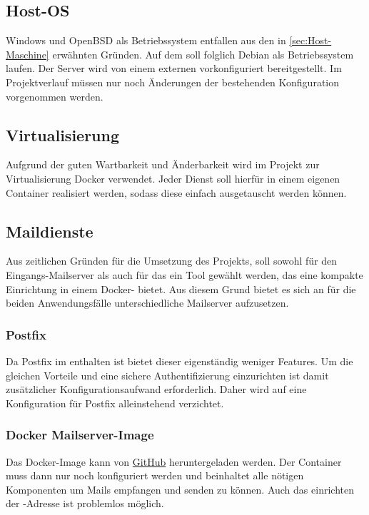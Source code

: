 \documentclass[a4paper,11pt,singlespacing]{article}
\begin{document}
	\subsection{Host-OS}\label{sec:AuswahlLösungHost-Maschine}
		Windows und OpenBSD als Betriebssystem entfallen aus den in \autoref{sec:Host-Maschine} erwähnten Gründen.
		Auf dem  soll folglich Debian als Betriebssystem laufen.
		Der Server wird von einem externen  vorkonfiguriert bereitgestellt.
		Im Projektverlauf müssen nur noch Änderungen der bestehenden Konfiguration vorgenommen werden.

	\subsection{Virtualisierung}\label{sec:AuswahlLösungVirtualisierung}
		Aufgrund der guten Wartbarkeit und Änderbarkeit wird im Projekt zur Virtualisierung Docker verwendet.
		Jeder Dienst soll hierfür in einem eigenen Container realisiert werden, sodass diese einfach ausgetauscht werden können.

	\subsection{Maildienste}\label{sec:AuswahlLösungMailserver}
		Aus zeitlichen Gründen für die Umsetzung des Projekts, soll sowohl für den Eingangs-Mailserver als auch für das  ein Tool gewählt werden, das eine kompakte Einrichtung in einem Docker- bietet.
		Aus diesem Grund bietet es sich an für die beiden Anwendungsfälle unterschiedliche Mailserver aufzusetzen.

		\subsubsection{Postfix}\label{sec:AuswahlLösungPostfix}	
			Da Postfix im  enthalten ist bietet dieser eigenständig weniger Features.
			Um die gleichen Vorteile und eine sichere Authentifizierung einzurichten ist damit zusätzlicher Konfigurationsaufwand erforderlich.
			Daher wird auf eine Konfiguration für Postfix alleinstehend verzichtet.

		\subsubsection{Docker Mailserver-Image}\label{sec:AuswahlLösungVorkonfigurierterDockerMailserver}
			Das Docker-Image kann von \href{https://github.com/tomav/docker-mailserver}{GitHub} heruntergeladen werden.
			Der Container muss dann nur noch konfiguriert werden und beinhaltet alle nötigen Komponenten um Mails empfangen und senden zu können. \cite{fullstackDockerMailserver}
			Auch das einrichten der -Adresse ist problemlos möglich.
\end{document}
